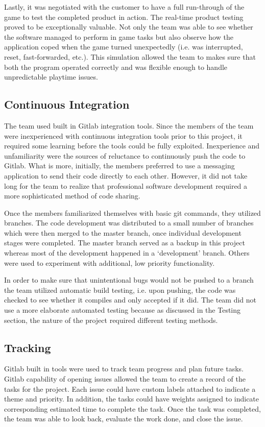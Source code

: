 \documentclass{l3proj}
\begin{document}
Lastly, it was negotiated with the customer to have a full run-through of the game to test the completed product in action. The real-time product testing 
proved to be exceptionally valuable. 
Not only the team was able to see whether the software managed to perform in game tasks but also observe how the application coped when the game turned 
unexpectedly (i.e. was interrupted, reset, fast-forwarded, etc.). This simulation allowed the team to makes sure that both the program operated correctly 
and was flexible enough to handle unpredictable playtime issues.

\subsection{Continuous Integration}
The team used built in Gitlab integration tools. Since the members of the team were inexperienced with continuous integration tools prior to this project, 
it required some learning before the tools could be fully exploited. Inexperience and unfamiliarity were the sources of reluctance to continuously push the 
code to Gitlab. What is more, initially, the members preferred to use a messaging application to send their code directly to each other. However, it did not 
take long for the team to realize that professional software development required a more sophisticated method of code sharing.

Once the members familiarized themselves with basic git commands, they utilized branches. The code development was distributed to a small number of branches 
which were then merged to the master branch, once individual development stages were completed. The master branch served as a backup in this project whereas 
most of the development happened in a ‘development’ branch. Others were used to experiment with additional, low priority functionality.

In order to make sure that unintentional bugs would not be pushed to a branch the team utilized automatic build testing, i.e. upon pushing, the code was 
checked to see whether it compiles and only accepted if it did. The team did not use a more elaborate automated testing because as discussed in the Testing 
section, the nature of the project required different testing methods.

\subsection{Tracking}
Gitlab built in tools were used to track team progress and plan future tasks. Gitlab capability of opening issues allowed the team to create a record of the 
tasks for the project. Each issue could have custom labels attached to indicate a theme and priority. In addition, the tasks could have weights assigned to 
indicate corresponding estimated time to complete the task. Once the task was completed, the team was able to look back, evaluate the work done, and close the 
issue.
\end{document}
